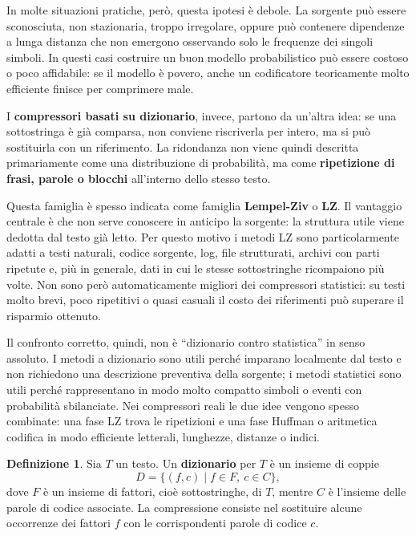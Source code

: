 \documentclass{article}
\theoremstyle{definition}
\newtheorem{definizione}{Definizione}[section]
\numberwithin{equation}{section}
\begin{document}
In molte situazioni pratiche, però, questa ipotesi è debole. La sorgente può essere sconosciuta, non stazionaria, troppo irregolare, oppure può contenere dipendenze a lunga distanza che non emergono osservando solo le frequenze dei singoli simboli. In questi casi costruire un buon modello probabilistico può essere costoso o poco affidabile: se il modello è povero, anche un codificatore teoricamente molto efficiente finisce per comprimere male.

I \textbf{compressori basati su dizionario}, invece, partono da un'altra idea: se una sottostringa è già comparsa, non conviene riscriverla per intero, ma si può sostituirla con un riferimento. La ridondanza non viene quindi descritta primariamente come una distribuzione di probabilità, ma come \textbf{ripetizione di frasi, parole o blocchi} all'interno dello stesso testo.

Questa famiglia è spesso indicata come famiglia \textbf{Lempel-Ziv} o \textbf{LZ}. Il vantaggio centrale è che non serve conoscere in anticipo la sorgente: la struttura utile viene dedotta dal testo già letto. Per questo motivo i metodi LZ sono particolarmente adatti a testi naturali, codice sorgente, log, file strutturati, archivi con parti ripetute e, più in generale, dati in cui le stesse sottostringhe ricompaiono più volte. Non sono però automaticamente migliori dei compressori statistici: su testi molto brevi, poco ripetitivi o quasi casuali il costo dei riferimenti può superare il risparmio ottenuto.

Il confronto corretto, quindi, non è ``dizionario contro statistica'' in senso assoluto. I metodi a dizionario sono utili perché imparano localmente dal testo e non richiedono una descrizione preventiva della sorgente; i metodi statistici sono utili perché rappresentano in modo molto compatto simboli o eventi con probabilità sbilanciate. Nei compressori reali le due idee vengono spesso combinate: una fase LZ trova le ripetizioni e una fase Huffman o aritmetica codifica in modo efficiente letterali, lunghezze, distanze o indici.

\begin{definizione}
    Sia $T$ un testo. Un \textbf{dizionario} per $T$ è un insieme di coppie
    \[
        D=\{(f,c)\mid f\in F,\ c\in C\},
    \]
    dove $F$ è un insieme di fattori, cioè sottostringhe, di $T$, mentre $C$ è l'insieme delle parole di codice associate. La compressione consiste nel sostituire alcune occorrenze dei fattori $f$ con le corrispondenti parole di codice $c$.
\end{definizione}
\end{document}

